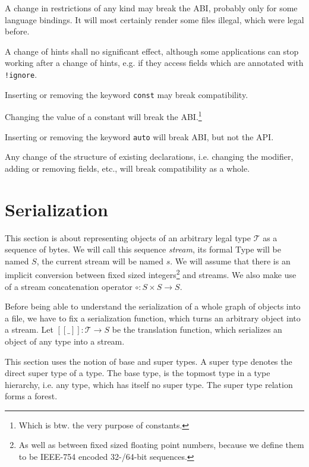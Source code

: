 \documentclass[a4paper,10pt]{article}
\newcommand{\den}[1]{[\![#1]\!]}
\begin{document}
A change in restrictions of any kind may break the ABI, probably only for some language bindings. It will most certainly render some files illegal, which were legal before.

A change of hints shall no significant effect, although some applications can stop working after a change of hints, e.g. if they access fields which are annotated with \verb/!ignore/.

Inserting or removing the keyword \texttt{const} may break compatibility.

Changing the value of a constant will break the ABI.\footnote{Which is btw. the very purpose of constants.}

Inserting or removing the keyword \texttt{auto} will break ABI, but not the API.

Any change of the structure of existing declarations, i.e. changing the modifier, adding or removing fields, etc., will break compatibility as a whole.

\section{Serialization}

This section is about representing objects of an arbitrary legal type $\mathcal{T}$ as a sequence of bytes. We will call this sequence \textit{stream}, its formal Type will be named $S$, the current stream will be named $s$. We will assume that there is an implicit conversion between fixed sized integers\footnote{As well as between fixed sized floating point numbers, because we define them to be IEEE-754 encoded 32-/64-bit sequences.} and streams. We also make use of a stream concatenation operator $\circ : S \times S → S$.

Before being able to understand the serialization of a whole graph of objects into a file, we have to fix a serialization function, which turns an arbitrary object into a stream. Let $\den{\_}:\mathcal{T} → S$ be the translation function, which serializes an object of any type into a stream.

This section uses the notion of base and super types. A super type denotes the direct super type of a type. The base type, is the topmost type in a type hierarchy, i.e. any type, which has itself no super type.
The super type relation forms a forest.
\end{document}
